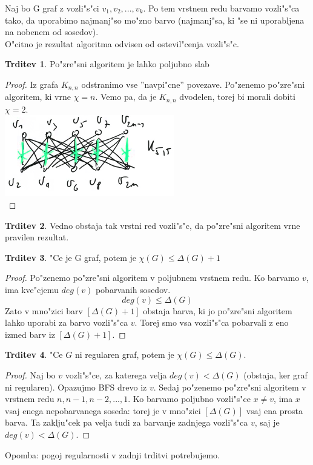 \documentclass{article}
\theoremstyle{definition}
\newtheorem{claim}{Trditev}[section]
\begin{document}
	Naj bo G graf z vozli"s"ci $v_1,v_2,...,v_k$. Po tem vrstnem redu barvamo vozli"s"ca tako, da uporabimo najmanj"so mo"zno barvo (najmanj"sa, ki "se ni uporabljena na nobenem od sosedov).\\
	O"citno je rezultat algoritma odvisen od ostevil"cenja vozli"s"c.
	
	\begin{claim}
		Po"zre"sni algoritem je lahko poljubno slab
		\begin{proof}
			Iz grafa $K_{n,n}$ odstranimo vse ''navpi"cne'' povezave. Po"zenemo po"zre"sni algoritem, ki vrne $\chi=n$. Vemo pa, da je $K_{n,n}$ dvodelen, torej bi morali dobiti $\chi=2$.
			\\ \includegraphics{navpicne} \\
		\end{proof}
	\end{claim}
	\begin{claim}
		Vedno obstaja tak vrstni red vozli"s"c, da po"zre"sni algoritem vrne pravilen rezultat.
	\end{claim}

	\begin{claim}
		"Ce je G graf, potem je $\chi(G) \leq \Delta(G) + 1$
		\begin{proof}
			Po"zenemo po"zre"sni algoritem v poljubnem vrstnem redu. Ko barvamo $v$, ima kve"cjemu $deg(v)$ pobarvanih sosedov. $$deg(v) \leq \Delta(G)$$
			Zato v mno"zici barv $[\Delta(G)+1]$ obstaja barva, ki jo po"zre"sni algoritem lahko uporabi za barvo vozli"s"ca $v$. Torej smo vsa vozli"s"ca pobarvali z eno izmed barv iz $[\Delta(G)+1]$.
		\end{proof}
	\end{claim}

	\begin{claim}
		"Ce $G$ ni regularen graf, potem je $\chi(G) \leq \Delta(G)$.
		\begin{proof}
			Naj bo $v$ vozli"s"ce, za katerega velja $deg(v) < \Delta(G)$ (obstaja, ker graf ni regularen). Opazujmo BFS drevo iz $v$. Sedaj po"zenemo po"zre"sni algoritem v vrstnem redu $n, n-1, n-2, ..., 1$. Ko barvamo poljubno vozli"s"ce $x \neq v$, ima $x$ vsaj enega nepobarvanega soseda: torej je v mno"zici $[\Delta(G)]$ vsaj ena prosta barva. Ta zaklju"cek pa velja tudi za barvanje zadnjega vozli"s"ca $v$, saj je $deg(v) < \Delta(G)$.
		\end{proof}
	\end{claim}
	Opomba: pogoj regularnosti v zadnji trditvi potrebujemo.
	
\end{document}
